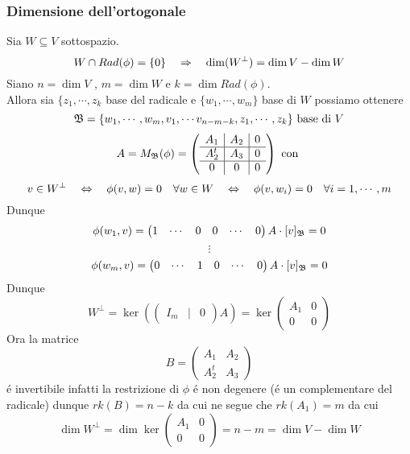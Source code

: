 \subsubsection{Dimensione dell'ortogonale}
\begin{prop}Sia $W \subseteq V $ sottospazio.
$$ W \cap Rad(\phi)=\{ 0 \} \quad \Rightarrow \quad \dim (W^\perp ) = \dim V - \dim W$$
\proof
Siano  $n=\dim V$ , $ m=\dim W $ e $k=\dim Rad (\phi)$.\\
Allora sia $\{ z_1, \cdots , z_k$ base del radicale e $\{w_1, \cdots , w_m \} $ base di $W$ possiamo ottenere
$$ \mathfrak{B} = \{ w_1, \cdots , w_m, v_1, \cdots v_{n-m-k} , z_1, \cdots , z_k \} \text{ base di } V$$
$$ A = M_{\mathfrak{B}} (\phi) =\left(\begin{array}{c|c|c}
A_1 & A_2 & 0 \\ \hline
A_2^t &A_3 & 0 \\ \hline
0 & 0 & 0 
\end{array} \right)  \text{ con }$$
$$v \in W^\perp \quad \Leftrightarrow \quad \phi(v,w)=0 \quad \forall w\in W \quad \Leftrightarrow \quad \phi(v,w_i)=0 \quad \forall i=1,\cdots, m$$
Dunque
$$ \phi(w_1,v)=  \begin{pmatrix}
1 & \cdots & 0 &0& \cdots & 0 
\end{pmatrix} A \cdot  [v]_{\mathfrak{B}} =0$$
$$ \vdots $$
$$ \phi(w_m,v) = \begin{pmatrix}
0 & \cdots & 1 & 0 & \cdots & 0 
\end{pmatrix} A  \cdot [v]_{\mathfrak{B}} =0$$
Dunque $$W^\perp = \ker \left( \begin{pmatrix}
I_m & \vert & 0 
\end{pmatrix}A \right)= \ker \left(  \begin{array}{c|c} A_1 & 0 \\ \hline
0 & 0 
\end{array} \right) $$
Ora la matrice 
$$B=  \left( \begin{array}{c|c}
A_1 & A_2 \\ \hline
A_2^t & A_3 
\end{array}\right)$$
\'e invertibile infatti la restrizione di $\phi$ \'e non degenere (\'e un complementare del radicale) dunque $rk(B)=n-k$ da cui ne segue che $rk(A_1)=m $ da cui 
$$ \dim W^\perp = \dim \ker \left( \begin{array}{c|c}A_1& 0 \\ \hline
0 &0 
\end{array}\right) = n-m= \dim V - \dim W $$
\end{prop}

